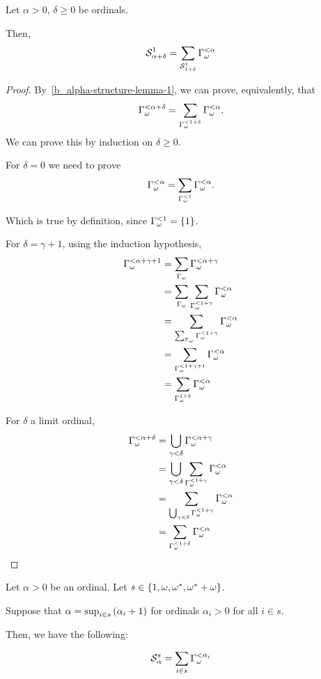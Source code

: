 \begin{corollary}
  Let $\alpha > 0$, $\delta \ge 0$ be ordinals.

  Then,
  \[
    \mathcal{S}^{1}_{\alpha + \delta}
    = \sum_{\mathcal{S}^{1}_{1 + \delta}}{\Gamma_{\omega}^{< \alpha}}
  \]
\end{corollary}

\begin{proof}
  By~\cref{b_alpha-structure-lemma-1}, we can prove, equivalently,
  that
  \[
    \Gamma_{\omega}^{< \alpha + \delta} = \sum_{\Gamma_{\omega}^{< 1 + \delta}}{\Gamma_{\omega}^{< \alpha}}.
  \]
  We can prove this by induction on $\delta \ge 0$.

  For $\delta = 0$ we need to prove
  \[
    \Gamma_{\omega}^{< \alpha} = \sum_{\Gamma_{\omega}^{< 1}}{\Gamma_{\omega}^{< \alpha}}.
  \]

  Which is true by definition, since $\Gamma_{\omega}^{< 1} = \left\{ {1} \right\}$. 

  For $\delta = \gamma + 1$, using the induction hypothesis,
  \[
    \begin{aligned}
      \Gamma_{\omega}^{< \alpha + \gamma + 1}
       & = \sum_{\Gamma_{\omega}}{\Gamma_{\omega}^{< \alpha + \gamma}}                    \\
       & = \sum_{\Gamma_{\omega}}{\sum_{\Gamma_{\omega}^{< 1 + \gamma}}{\Gamma_{\omega}^{< \alpha}}} \\
       & = \sum_{\sum_{\Gamma_{\omega}}{\Gamma_{\omega}^{< 1 + \gamma}}}{\Gamma_{\omega}^{< \alpha}} \\
       & = \sum_{\Gamma_{\omega}^{< 1 + \gamma + 1}}{\Gamma_{\omega}^{< \alpha}}          \\
       & = \sum_{\Gamma_{\omega}^{1 + \delta}}{\Gamma_{\omega}^{< \alpha}}
    \end{aligned}
  \]

  For $\delta$ a limit ordinal,
  \[
    \begin{aligned}
      \Gamma_{\omega}^{< \alpha + \delta}
       & = \bigcup_{\gamma < \delta}{\Gamma_{\omega}^{< \alpha + \gamma}} \\
       & = \bigcup_{\gamma < \delta}{\sum_{\Gamma_{\omega}^{< 1 + \gamma}}{\Gamma_{\omega}^{< \alpha}}} \\
       & = \sum_{\bigcup_{\gamma < \delta}{\Gamma_{\omega}^{< 1 + \gamma}}}{\Gamma_{\omega}^{< \alpha}} \\
       & = \sum_{\Gamma_{\omega}^{< 1 + \delta}}{\Gamma_{\omega}^{< \alpha}}
    \end{aligned}
  \]

\end{proof}

\begin{lemma}\label{b_alpha-structure-lemma}
  Let $\alpha > 0$ be an ordinal.
  Let $s \in \left\{ {1, \omega, \omega^\ast, \omega^\ast + \omega} \right\}$.

  Suppose that
  $\alpha = \sup_{i \in s} \left( {\alpha_i + 1} \right)$ for
  ordinals $\alpha_i > 0$ for all $i \in s$.

  Then, we have the following:

  \[
    \mathcal{S}^{s}_{\alpha} = \sum_{i \in s}{\Gamma_{\omega}^{< \alpha_i}}
  \]
\end{lemma}


